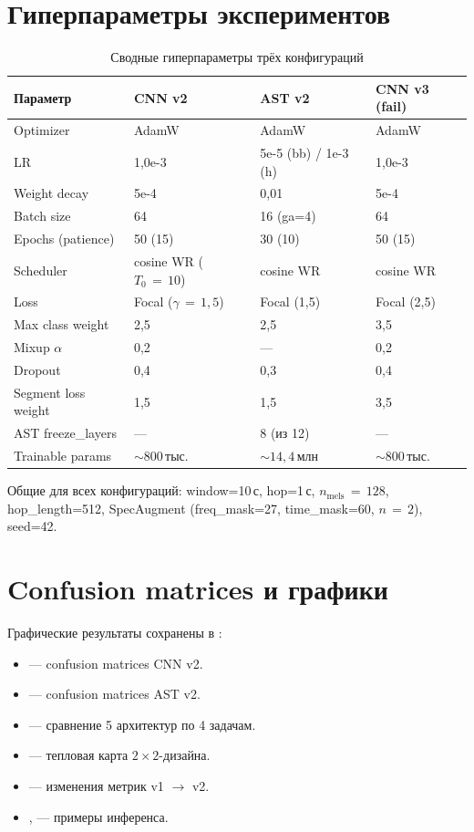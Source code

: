 \chapter{Гиперпараметры экспериментов}\label{app:B}

\begin{table}[H]
\centering
\caption{Сводные гиперпараметры трёх конфигураций}
\begin{tabular}{L{5cm}C{2.5cm}C{2.5cm}C{2.5cm}}
\toprule
Параметр & CNN v2 & AST v2 & CNN v3 (fail) \\
\midrule
Optimizer & AdamW & AdamW & AdamW \\
LR & 1{,}0e-3 & 5e-5 (bb) / 1e-3 (h) & 1{,}0e-3 \\
Weight decay & 5e-4 & 0{,}01 & 5e-4 \\
Batch size & 64 & 16 (ga=4) & 64 \\
Epochs (patience) & 50 (15) & 30 (10) & 50 (15) \\
Scheduler & cosine WR ($T_0\,{=}\,10$) & cosine WR & cosine WR \\
Loss & Focal ($\gamma\,{=}\,1{,}5$) & Focal (1{,}5) & Focal (2{,}5) \\
Max class weight & 2{,}5 & 2{,}5 & 3{,}5 \\
Mixup $\alpha$ & 0{,}2 & --- & 0{,}2 \\
Dropout & 0{,}4 & 0{,}3 & 0{,}4 \\
Segment loss weight & 1{,}5 & 1{,}5 & 3{,}5 \\
AST freeze\_layers & --- & 8 (из 12) & --- \\
Trainable params & $\sim 800$\,тыс. & $\sim 14{,}4$\,млн & $\sim 800$\,тыс. \\
\bottomrule
\end{tabular}
\end{table}

Общие для всех конфигураций: window=10\,с, hop=1\,с, $n_{\text{mels}}\,{=}\,128$, hop\_length=512, SpecAugment (freq\_mask=27, time\_mask=60, $n\,{=}\,2$), seed=42.

\chapter{Confusion matrices и графики}\label{app:C}

Графические результаты сохранены в :

\begin{itemize}
  \item {} --- confusion matrices CNN v2.
  \item {} --- confusion matrices AST v2.
  \item {} --- сравнение 5 архитектур по 4 задачам.
  \item {} --- тепловая карта $2{\times}2$-дизайна.
  \item {} --- изменения метрик v1 $\to$ v2.
  \item {},  --- примеры инференса.
\end{itemize}

